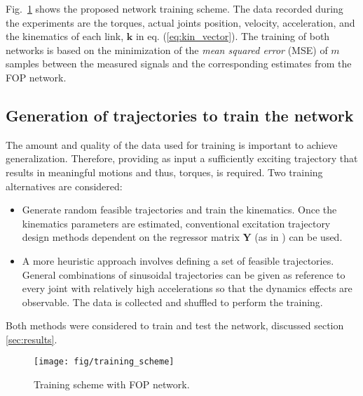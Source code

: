 Fig.~\ref{fig:NN_scheme} shows the proposed network training scheme. The data recorded during the experiments are the torques, actual joints position, velocity, acceleration, and the kinematics of each link, $\bm{k}$ in eq. (\ref{eq:kin_vector}).
%
The training of both networks is based on the minimization of the \emph{mean squared error} (MSE) of $m$ samples between the measured signals and the corresponding estimates from the FOP network. 

\subsection{Generation of trajectories to train the network}\label{sec:trajectory}
The amount and quality of the data used for training is important to achieve generalization. Therefore, providing as input a sufficiently exciting trajectory that results in meaningful motions and thus, torques, is required. Two training alternatives are considered:
\begin{itemize}
\item Generate random feasible trajectories and train the kinematics. Once the kinematics parameters are estimated, conventional excitation trajectory design methods dependent on the regressor matrix $\bm{Y}$ (as in \cite{Park2006}) can be used.
\item A more heuristic approach involves defining a set of feasible trajectories. General combinations of sinusoidal trajectories can be given as reference to every joint with relatively high accelerations so that the dynamics effects are observable. The data is collected and shuffled to perform the training. 
\end{itemize}
Both methods were considered to train and test the network, discussed section \ref{sec:results}.
\begin{figure}[t!]
\begin{center}
    \texttt{[image: fig/training\_scheme]}
    \caption{Training scheme with FOP network.}
    \label{fig:NN_scheme}
\end{center}
\end{figure}
